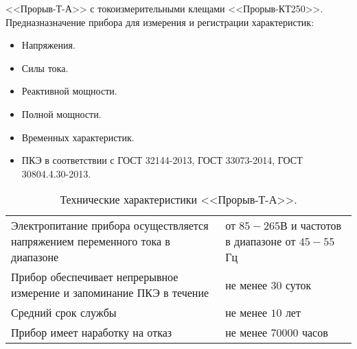 <<Прорыв-Т-А>> с токоизмерительными клещами <<Прорыв-КТ250>>.
Предназназначение прибора для измерения и регистрации характеристик:
\begin{itemize}
	\item Напряжения.
	\item Силы тока.
	\item Реактивной мощности.
	\item Полной мощности.
	\item Временных характеристик.
	\item ПКЭ в соответствии с ГОСТ 32144-2013, ГОСТ 33073-2014, ГОСТ 30804.4.30-2013.
\end{itemize}

\begin{table} [p]%
	\caption{Технические характеристики <<Прорыв-Т-А>>.}%
	\label{tbl:test3}%
	\begin{SingleSpace}
		\setlength\extrarowheight{6pt} %
		\setlength{\tymin}{1.9cm}%
		\begin{tabulary}{\textwidth}{@{}>{\zz}L >{\zz}L @{}}%
			\toprule     %
			Электропитание прибора осуществляется напряжением переменного тока в диапазоне & 
			от $85-265$В и частотов в диапазоне от $45-55$Гц\\
			
			Прибор обеспечивает непрерывное измерение и запоминание ПКЭ в течение &
			не менее $30$ суток \\
			
			Средний срок службы &
			не менее $10$ лет\\
			
			Прибор имеет наработку на отказ& не менее $70000$ часов \\
			
			
			\bottomrule %
		\end{tabulary}%
	\end{SingleSpace}
\end{table}

